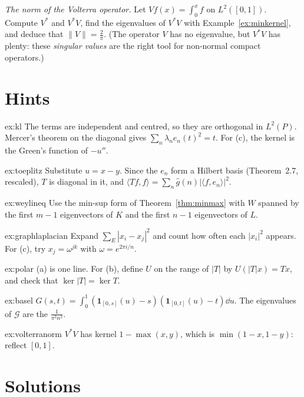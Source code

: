\begin{exercise}[$\star\star$]\label{ex:volterranorm}
\emph{The norm of the Volterra operator.} Let $Vf(x)=\int_0^xf$ on $L^2([0,1])$. Compute $V^*$ and $V^*V$, find the eigenvalues of $V^*V$ with Example~\ref{ex:minkernel}, and deduce that $\|V\|=\frac2\pi$. (The operator $V$ has no
eigenvalue, but $V^*V$ has plenty: these \emph{singular values} are the right tool for non-normal compact operators.)
\end{exercise}

\section{Hints}

\begin{hint}{ex:kl}
The terms are independent and centred, so they are orthogonal in $L^2(P)$. Mercer's theorem on the diagonal gives $\sum_n\lambda_ne_n(t)^2=t$. For (c), the kernel is the Green's function of $-u''$.
\end{hint}
\begin{hint}{ex:toeplitz}
Substitute $u=x-y$. Since the $e_n$ form a Hilbert basis (Theorem~2.7, rescaled), $T$ is diagonal in it, and $\langle Tf,f\rangle=\sum_n\hat g(n)|\langle f,e_n\rangle|^2$.
\end{hint}
\begin{hint}{ex:weylineq}
Use the min-sup form of Theorem~\ref{thm:minmax} with $W$ spanned by the first $m-1$ eigenvectors of $K$ and the first $n-1$ eigenvectors of $L$.
\end{hint}
\begin{hint}{ex:graphlaplacian}
Expand $\sum_E|x_i-x_j|^2$ and count how often each $|x_i|^2$ appears. For (c), try $x_j=\omega^{jk}$ with $\omega=e^{2\pi i/n}$.
\end{hint}
\begin{hint}{ex:polar}
(a) is one line. For (b), define $U$ on the range of $|T|$ by $U(|T|x)=Tx$, and check that $\ker|T|=\ker T$.
\end{hint}
\begin{hint}{ex:basel}
$G(s,t)=\int_0^1(\mathbf 1_{[0,s]}(u)-s)(\mathbf 1_{[0,t]}(u)-t)\dd u$. The eigenvalues of $\mathcal G$ are the $\frac1{\pi^2n^2}$.
\end{hint}
\begin{hint}{ex:volterranorm}
$V^*V$ has kernel $1-\max(x,y)$, which is $\min(1-x,1-y)$: reflect $[0,1]$.
\end{hint}

\section{Solutions}

